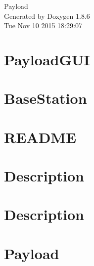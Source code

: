 \documentclass[twoside]{book}
\newcommand{\clearemptydoublepage}{%
  \newpage{\pagestyle{empty}\cleardoublepage}%
}
\begin{document}
\hypersetup{pageanchor=false}
\begin{titlepage}
\vspace*{7cm}
\begin{center}%
{\Large Payload }\\
\vspace*{1cm}
{\large Generated by Doxygen 1.8.6}\\
\vspace*{0.5cm}
{\small Tue Nov 10 2015 18:29:07}\\
\end{center}
\end{titlepage}
\clearemptydoublepage
\tableofcontents
\clearemptydoublepage
{}
\hypersetup{pageanchor=true}

\chapter{Payload\-G\-U\-I}
\label{md_BaseStation_PayloadGUI_README}
\hypertarget{md_BaseStation_PayloadGUI_README}{}

\chapter{Base\-Station}
\label{md_BaseStation_README}
\hypertarget{md_BaseStation_README}{}

\chapter{R\-E\-A\-D\-M\-E}
\label{md_Payload_ADLC_README}
\hypertarget{md_Payload_ADLC_README}{}

\chapter{Description}
\label{md_Payload_ADLC_SalientDetection_README}
\hypertarget{md_Payload_ADLC_SalientDetection_README}{}

\chapter{Description}
\label{md_Payload_ADLC_ShapeCharacterization_README}
\hypertarget{md_Payload_ADLC_ShapeCharacterization_README}{}

\chapter{Payload}
\label{md_README}
\hypertarget{md_README}{}

\end{document}
